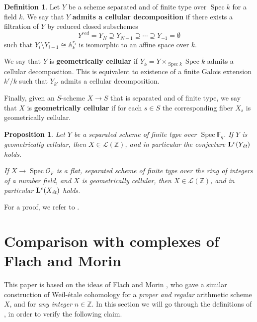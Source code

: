 \documentclass[leqno,12pt]{article}
\theoremstyle{plain}
\newtheorem{proposition}[theorem]{\indent\sc Proposition}
\theoremstyle{definition}
\newtheorem{definition}[theorem]{\indent\sc Definition}
\DeclareMathOperator{\Spec}{Spec}
\newcommand{\FF}{\mathbb{F}}
\newcommand{\ZZ}{\mathbb{Z}}
\renewcommand{\AA}{\mathbb{A}}
\newcommand{\et}{\text{\it \'{e}t}}
\begin{document}
\begin{definition}
  Let $Y$ be a scheme separated and of finite type over $\Spec k$ for a field
  $k$. We say that $Y$ \textbf{admits a cellular decomposition} if there exists
  a filtration of $Y$ by reduced closed subschemes
  $$Y^{red} = Y_N \supseteq Y_{N-1} \supseteq \cdots \supseteq Y_{-1} = \emptyset$$
  such that $Y_i\setminus Y_{i-1} \cong \AA^{r_i}_k$ is isomorphic to an affine
  space over $k$.

  We say that $Y$ is \textbf{geometrically cellular} if
  $Y_{\overline{k}} = Y \times_{\Spec k} \Spec \overline{k}$ admits a cellular
  decomposition. This is equivalent to existence of a finite Galois extension
  $k'/k$ such that $Y_{k'}$ admits a cellular decomposition.

  Finally, given an $S$-scheme $X \to S$ that is separated and of finite type,
  we say that $X$ is \textbf{geometrically cellular} if for each $s \in S$ the
  corresponding fiber $X_s$ is geometrically cellular.
\end{definition}

\begin{proposition}
  Let $Y$ be a separated scheme of finite type over $\Spec \FF_q$.
  If $Y$ is geometrically cellular, then $X \in \mathcal{L} (\ZZ)$,
  and in particular the conjecture $\mathbf{L}^c (Y_\et)$ holds.

  If $X \to \Spec \mathcal{O}_F$ is a flat, separated scheme of finite type over
  the ring of integers of a number field, and $X$ is geometrically cellular,
  then $X \in \mathcal{L} (\ZZ)$, and in particular $\mathbf{L}^c (X_\et)$
  holds.
\end{proposition}

For a proof, we refer to \cite[Proposition~5.14]{Morin-2014}.


\section{Comparison with complexes of Flach and Morin}
\label{sec:comparison-with-FM}

This paper is based on the ideas of Flach and Morin \cite{Flach-Morin-2018}, who
gave a similar construction of Weil-\'{e}tale cohomology for a
\emph{proper and regular} arithmetic scheme $X$, and for \emph{any integer}
$n \in \ZZ$. In this section we will go through the definitions of
\cite{Flach-Morin-2018}, in order to verify the following claim.
\end{document}
